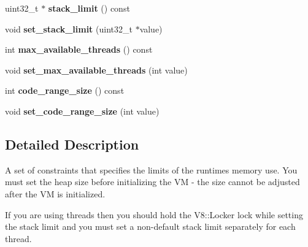 \begin{DoxyCompactItemize}
\item 
\hypertarget{classv8_1_1_resource_constraints_aafc4a94f2eeb0684e7a50f355eb4d06d}{}uint32\+\_\+t $\ast$ {\bfseries stack\+\_\+limit} () const \label{classv8_1_1_resource_constraints_aafc4a94f2eeb0684e7a50f355eb4d06d}

\item 
\hypertarget{classv8_1_1_resource_constraints_a26ed3e89985a4afe34e84509fb093cf1}{}void {\bfseries set\+\_\+stack\+\_\+limit} (uint32\+\_\+t $\ast$value)\label{classv8_1_1_resource_constraints_a26ed3e89985a4afe34e84509fb093cf1}

\item 
\hypertarget{classv8_1_1_resource_constraints_a27a36f0bacb800468d3574f738d12436}{}int {\bfseries max\+\_\+available\+\_\+threads} () const \label{classv8_1_1_resource_constraints_a27a36f0bacb800468d3574f738d12436}

\item 
\hypertarget{classv8_1_1_resource_constraints_a1bec2735c94ff50bfbd54bd70f004b72}{}void {\bfseries set\+\_\+max\+\_\+available\+\_\+threads} (int value)\label{classv8_1_1_resource_constraints_a1bec2735c94ff50bfbd54bd70f004b72}

\item 
\hypertarget{classv8_1_1_resource_constraints_a91c28dde0404a85822bbdbc3d77ed01b}{}int {\bfseries code\+\_\+range\+\_\+size} () const \label{classv8_1_1_resource_constraints_a91c28dde0404a85822bbdbc3d77ed01b}

\item 
\hypertarget{classv8_1_1_resource_constraints_a4f13be58a17eaa391480f19cfc0b8cb5}{}void {\bfseries set\+\_\+code\+\_\+range\+\_\+size} (int value)\label{classv8_1_1_resource_constraints_a4f13be58a17eaa391480f19cfc0b8cb5}

\end{DoxyCompactItemize}


\subsection{Detailed Description}
A set of constraints that specifies the limits of the runtime\textquotesingle{}s memory use. You must set the heap size before initializing the V\+M -\/ the size cannot be adjusted after the V\+M is initialized.

If you are using threads then you should hold the V8\+::\+Locker lock while setting the stack limit and you must set a non-\/default stack limit separately for each thread. 

